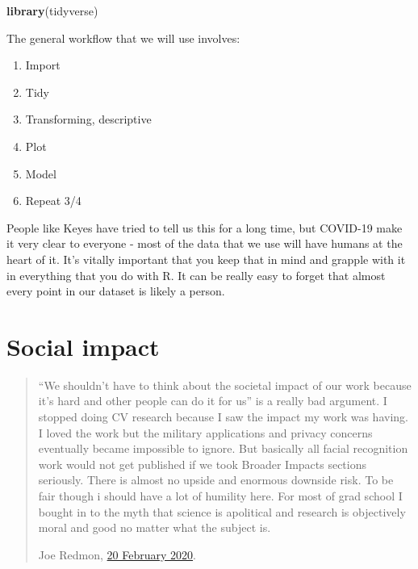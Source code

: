 \documentclass[
]{book}
\newenvironment{Shaded}{\begin{snugshade}}{\end{snugshade}}
\newcommand{\KeywordTok}[1]{\textcolor[rgb]{0.13,0.29,0.53}{\textbf{#1}}}
\newcommand{\NormalTok}[1]{#1}
\providecommand{\tightlist}{%
  \setlength{\itemsep}{0pt}\setlength{\parskip}{0pt}}
\begin{document}
\begin{Shaded}
\begin{Highlighting}[]
\KeywordTok{library}\NormalTok{(tidyverse)}
\end{Highlighting}
\end{Shaded}

The general workflow that we will use involves:

\begin{enumerate}
\def\labelenumi{\arabic{enumi}.}
\tightlist
\item
  Import
\item
  Tidy
\item
  Transforming, descriptive
\item
  Plot
\item
  Model
\item
  Repeat 3/4
\end{enumerate}

People like Keyes have tried to tell us this for a long time, but COVID-19 make it very clear to everyone - most of the data that we use will have humans at the heart of it. It's vitally important that you keep that in mind and grapple with it in everything that you do with R. It can be really easy to forget that almost every point in our dataset is likely a person.

\hypertarget{social-impact}{%
\section{Social impact}\label{social-impact}}

\begin{quote}
``We shouldn't have to think about the societal impact of our work because it's hard and other people can do it for us'' is a really bad argument. I stopped doing CV research because I saw the impact my work was having. I loved the work but the military applications and privacy concerns eventually became impossible to ignore. But basically all facial recognition work would not get published if we took Broader Impacts sections seriously. There is almost no upside and enormous downside risk. To be fair though i should have a lot of humility here. For most of grad school I bought in to the myth that science is apolitical and research is objectively moral and good no matter what the subject is.

Joe Redmon, \href{https://twitter.com/pjreddie/status/1230524770350817280}{20 February 2020}.
\end{quote}
\end{document}
